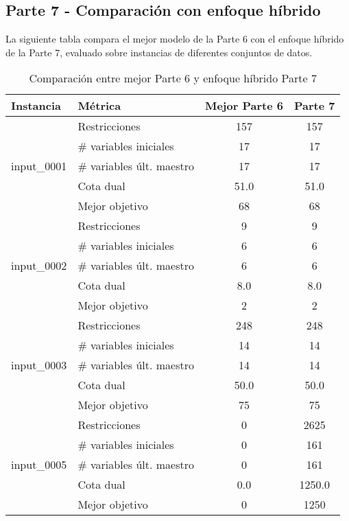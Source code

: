 \documentclass[a4paper,12pt]{article}
\begin{document}
\clearpage

\subsection{Parte 7 - Comparación con enfoque híbrido}

La siguiente tabla compara el mejor modelo de la Parte 6 con el enfoque híbrido de la Parte 7, evaluado sobre instancias de diferentes conjuntos de datos.

\begin{table}[!ht]
\centering
\renewcommand{\arraystretch}{1.2}
\begin{tabular}{llcc}
\toprule
\textbf{Instancia} & \textbf{Métrica} & \textbf{Mejor Parte 6} & \textbf{Parte 7} \\
\midrule
\multirow{5}{*}{input\_0001} 
  & Restricciones               & 157   & 157   \\
  & \# variables iniciales      & 17    & 17    \\
  & \# variables últ. maestro   & 17    & 17    \\
  & Cota dual                   & 51.0  & 51.0  \\
  & Mejor objetivo              & 68    & 68    \\
\midrule
\multirow{5}{*}{input\_0002} 
  & Restricciones               & 9     & 9     \\
  & \# variables iniciales      & 6     & 6     \\
  & \# variables últ. maestro   & 6     & 6     \\
  & Cota dual                   & 8.0   & 8.0   \\
  & Mejor objetivo              & 2     & 2     \\
\midrule
\multirow{5}{*}{input\_0003} 
  & Restricciones               & 248   & 248   \\
  & \# variables iniciales      & 14    & 14    \\
  & \# variables últ. maestro   & 14    & 14    \\
  & Cota dual                   & 50.0  & 50.0  \\
  & Mejor objetivo              & 75    & 75    \\
\midrule
\multirow{5}{*}{input\_0005} 
  & Restricciones               & 0     & 2625  \\
  & \# variables iniciales      & 0     & 161   \\
  & \# variables últ. maestro   & 0     & 161   \\
  & Cota dual                   & 0.0   & 1250.0\\
  & Mejor objetivo              & 0     & 1250  \\
\bottomrule
\end{tabular}
\caption{Comparación entre mejor Parte 6 y enfoque híbrido Parte 7}
\end{table}
\end{document}
